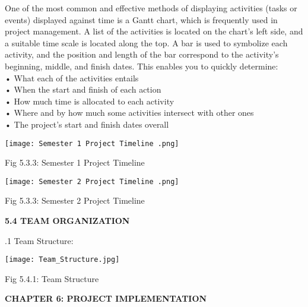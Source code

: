 \documentclass[12pt]{article}
\begin{document}
One of the most common and effective methods of displaying activities (tasks or events) displayed against 
time is a Gantt chart, which is frequently used in project management. A list of the activities is located on the 
chart’s left side, and a suitable time scale is located along the top. A bar is used to symbolize each activity, and 
the position and length of the bar correspond to the activity’s beginning, middle, and finish dates. This enables you to quickly determine: \\
• What each of the activities entails \\
• When the start and finish of each action \\
• How much time is allocated to each activity\\ 
• Where and by how much some activities intersect with other ones \\
• The project’s start and finish dates overall \\
\pagebreak{}
\bigskip
\bigskip
\bigskip
\bigskip
\begin{center}
   \justify \texttt{[image: Semester 1 Project Timeline .png]}
\end{center}

\begin{center}
    Fig 5.3.3: Semester 1 Project Timeline
\end{center}

\begin{center}
   \justify \texttt{[image: Semester 2 Project Timeline .png]}
\end{center}

\begin{center}
    Fig 5.3.3: Semester 2 Project Timeline
\end{center}
\pagebreak{}
\bigskip

\justify \textbf{5.4 TEAM ORGANIZATION}

.1 Team Structure:\\

\begin{center}
   \justify \texttt{[image: Team\_Structure.jpg]}
\end{center}

\begin{center}
    Fig 5.4.1: Team Structure
\end{center}
\pagebreak{}

\begin{center} \fontsize{14}{14} \textbf{CHAPTER 6: PROJECT IMPLEMENTATION } \end{center}
\end{document}
